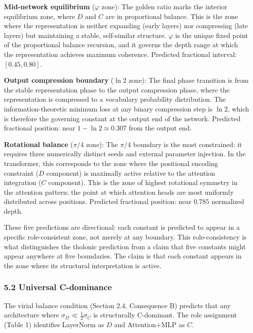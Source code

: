 \documentclass[
  11pt,
  letterpaper,
]{article}
\begin{document}
\textbf{Mid-network equilibrium} (\(\varphi\) zone): The golden ratio
marks the interior equilibrium zone, where \(D\) and \(C\) are in
proportional balance. This is the zone where the representation is
neither expanding (early layers) nor compressing (late layers) but
maintaining a stable, self-similar structure. \(\varphi\) is the unique
fixed point of the proportional balance recursion, and it governs the
depth range at which the representation achieves maximum coherence.
Predicted fractional interval: \([0.45, 0.80]\).

\textbf{Output compression boundary} (\(\ln 2\) zone): The final phase
transition is from the stable representation phase to the output
compression phase, where the representation is compressed to a
vocabulary probability distribution. The information-theoretic minimum
loss at any binary compression step is \(\ln 2\), which is therefore the
governing constant at the output end of the network. Predicted
fractional position: near \(1 - \ln 2 \approx 0.307\) from the output
end.

\textbf{Rotational balance} (\(\pi/4\) zone): The \(\pi/4\) boundary is
the most constrained: it requires three numerically distinct seeds and
external parameter injection. In the transformer, this corresponds to
the zone where the positional encoding constraint (\(D\) component) is
maximally active relative to the attention integration (\(C\)
component). This is the zone of highest rotational symmetry in the
attention pattern: the point at which attention heads are most uniformly
distributed across positions. Predicted fractional position: near
\(0.785\) normalized depth.

These five predictions are directional: each constant is predicted to
appear in a specific role-consistent zone, not merely at any boundary.
This role-consistency is what distinguishes the tholonic prediction from
a claim that five constants might appear anywhere at five boundaries.
The claim is that each constant appears in the zone where its structural
interpretation is active.

\subsubsection{5.2 Universal C-dominance}\label{universal-c-dominance}

The virial balance condition (Section 2.4, Consequence B) predicts that
any architecture where \(\sigma_D \ll \frac{1}{2}\sigma_C\) is
structurally C-dominant. The role assignment (Table 1) identifies
LayerNorm as \(D\) and Attention+MLP as \(C\).
\end{document}
